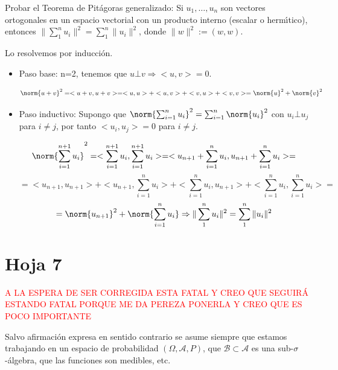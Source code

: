 
\begin{problem}[3] Probar el Teorema de Pit\'agoras generalizado: Si $u_1, \dots, u_n$ son vectores ortogonales
en un espacio vectorial con un producto interno (escalar o herm\'{\i}tico), entonces
$\|\sum_1^n u_i\|^2 = \sum_1^n \| u_i\|^2$, donde  $\| w\|^2:= (w,w)$.

\solution

\begin{expla}
Lo resolvemos por inducción.
\end{expla}

\begin{itemize}
\item Paso base: n=2, tenemos que $u \bot v \Rightarrow <u,v>=0$.

\[
\norm{u+v}^2=<u+v,u+v>=<u,u>+<u,v>+<v,u>+<v,v> = \norm{u}^2 + \norm{v}^2
\]

\item Paso inductivo: Supongo que $\norm{\sum_{i=1}^n u_i}^2 = \sum_{i=1}^{n} \norm{u_i}^2 $ con $u_i \bot u_j$ para $i\neq j$, por tanto $<u_i,u_j>=0$ para $i \neq j$.

\[
\norm{\sum_{i=1}^{n+1} u_i}^2 = <\sum_{i=1}^{n+1} u_i, \sum_{i=1}^{n+1} u_i> = <u_{n+1}+\sum_{i=1}^n u_i,u_{n+1}+\sum_{i=1}^n u_i> =
\]
\[
= <u_{n+1},u_{n+1}>+<u_{n+1},\sum_{i=1}^n u_i> + <\sum_{i=1}^n u_i, u_{n+1}>+<\sum_{i=1}^n u_i,\sum_{i=1}^n u_i>=
\]
\[
=\norm{u_{n+1}}^2 + \norm{\sum_{i=1}^{n} u_i} \Rightarrow \|\sum_1^n u_i\|^2 = \sum_1^n \| u_i\|^2
\]
\end{itemize}



\end{problem}



\newpage
\section{Hoja 7}
\textcolor{red}{A LA ESPERA DE SER CORREGIDA ESTA FATAL Y CREO QUE SEGUIRÁ ESTANDO FATAL PORQUE ME DA PEREZA PONERLA Y CREO QUE ES POCO IMPORTANTE}

Salvo afirmaci\'on expresa en sentido
contrario se asume siempre que estamos trabajando en un espacio de probabilidad $(\Omega, \mathcal{A}, P)$,
que  $\mathcal{B}\subset \mathcal{A}$ es una sub-$\sigma$-\'algebra, que las funciones son medibles, etc.

